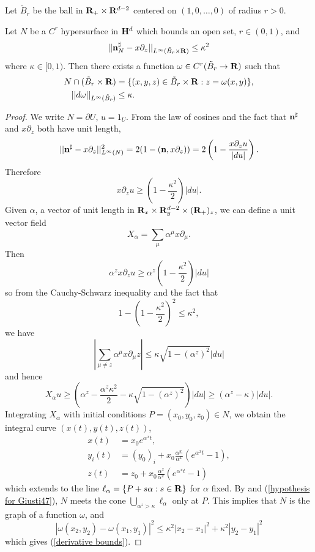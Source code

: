 \begin{notation}
Let $\tilde B_r$ be the ball in $\mathbf{R}_+ \times \mathbf{R}^{d - 2}$ centered on $(1, 0, \dots, 0)$ of radius $r > 0$.
\end{notation}

\begin{lemma}\label{hopfKilling}
Let $N$ be a $C^r$ hypersurface in $\mathbf H^d$ which bounds an open set, $r \in (0, 1)$, and
\begin{equation}\label{kappa-correct alignment}
||\mathbf n_N^\sharp - x\partial_z||_{L^\infty(\tilde B_r \times \mathbf{R})} \leq \kappa^2
\end{equation}
where $\kappa \in [0, 1)$.
Then there exists a function $\omega \in C^r(\tilde B_r \to \mathbf{R})$
such that
\begin{align}
    N \cap (\tilde B_r \times \mathbf{R}) &= \{(x, y, z) \in \tilde B_r\times \mathbf{R}: z = \omega(x, y)\}, \label{N is a graph}\\
    ||d\omega||_{L^\infty(\tilde B_r)} &\leq \kappa. \label{derivative bounds}
\end{align}
\end{lemma}
\begin{proof}
We write $N = \partial U$, $u = 1_U$.
From the law of cosines and the fact that $\mathbf n^\sharp$ and $x\partial_z$ both have unit length,
$$||\mathbf n^\sharp - x\partial_z||_{L^\infty(N)}^2 = 2(1 - (\mathbf n, x\partial_z)) = 2\left(1 - \frac{x\partial_z u}{|du|}\right).$$
Therefore
$$x\partial_z u \geq \left(1 - \frac{\kappa^2}{2}\right) |du|.$$
Given $\alpha$, a vector of unit length in $\mathbf{R}_x \times \mathbf{R}^{d - 2}_y \times (\mathbf{R}_+)_z$, we can define a unit vector field
$$X_\alpha = \sum_\mu \alpha^\mu x\partial_\mu.$$
Then
$$\alpha^z x\partial_z u \geq \alpha^z \left(1 - \frac{\kappa^2}{2}\right) |du|$$
so from the Cauchy-Schwarz inequality and the fact that
$$1 - \left(1 - \frac{\kappa^2}{2}\right)^2 \leq \kappa^2,$$
we have
$$\left|\sum_{\mu \neq z} \alpha^\mu x\partial_\mu z\right| \leq \kappa\sqrt{1 - (\alpha^z)^2} |du|$$
and hence
\begin{equation}\label{hypothesis for Giusti47}
X_\alpha u \geq \left(\alpha^z - \frac{\alpha^z \kappa^2}{2} - \kappa\sqrt{1 - (\alpha^z)^2}\right)|du| \geq (\alpha^z - \kappa)|du|.
\end{equation}
Integrating $X_\alpha$ with initial conditions $P = (x_0, y_0, z_0) \in N$, we obtain the integral curve $(x(t), y(t), z(t))$,
\begin{align*}
x(t) &= x_0 e^{\alpha^x t}, \\
y_i(t) &= (y_0)_i + x_0 \frac{\alpha^{y_i}}{\alpha^x}(e^{\alpha^x t} - 1),\\
z(t) &= z_0 + x_0 \frac{\alpha^z}{\alpha^x}(e^{\alpha^x t} - 1)
\end{align*}
which extends to the line $\ell_\alpha = \{P + s\alpha: s \in \mathbf{R}\}$ for $\alpha$ fixed.
By \cite[Remark 4.7]{Giusti77} and (\ref{hypothesis for Giusti47}), $N$ meets the cone $\bigcup_{\alpha^z > \kappa} \ell_\alpha$
only at $P$. This implies that $N$ is the graph of a function $\omega$, and
$$|\omega(x_2, y_2) - \omega(x_1, y_1)|^2 \leq \kappa^2 |x_2 - x_1|^2 + \kappa^2 |y_2 - y_1|^2$$
which gives (\ref{derivative bounds}).
\end{proof}

